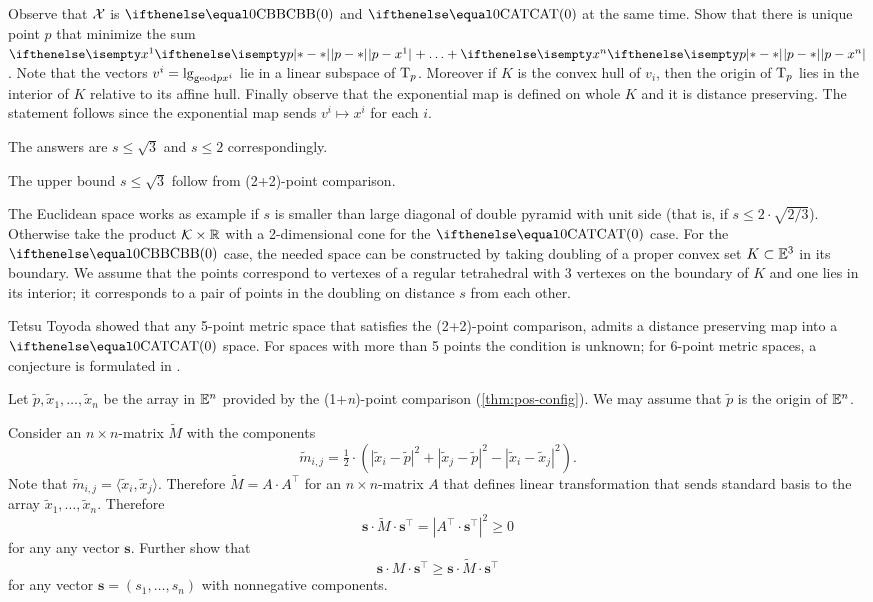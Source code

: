 Observe that $\mathcal{X}$ is $\Alex0$ and $\CAT0$ at the same time.
Show that there is unique point $p$ that minimize the sum $\dist{p}{x^1}{}+\dots+\dist{p}{x^n}{}$.
Note that the vectors $v^i=\lg_{\mathrm{geod}{p}{x^i}}$ lie in a linear subspace of $\text{\rm T}_p$.
Moreover if $K$ is the convex hull of $v_i$, then the origin of $\text{\rm T}_p$ lies in the interior of $K$ relative to its affine hull.
Finally observe that the exponential map is defined on whole $K$ and it is distance preserving.
The statement follows since the exponential map sends $v^i\mapsto x^i$ for each $i$.

The answers are $s\le \sqrt3$ and $s\le 2$ correspondingly.

The upper bound $s\le \sqrt3$ follow from (2+2)-point comparison.

The Euclidean space works as example if $s$ is smaller than large diagonal of double pyramid with unit side (that is, if $s\le 2\cdot\sqrt{2/3}$).
Otherwise take the product $\spc{K}\times \RR$ with a 2-dimensional cone for the $\CAT0$ case.
For the $\Alex0$ case, the needed space can be constructed by taking doubling of a proper convex set $K\subset\EE^3$ in its boundary.
We assume that the points correspond to vertexes of a regular tetrahedral with 3 vertexes on the boundary of $K$ and one lies in its interior; it corresponds to a pair of points in the doubling on distance $s$ from each other.

Tetsu Toyoda \cite{toyoda} showed that any 5-point metric space that satisfies the (2+2)-point comparison, admits a distance preserving map into a $\CAT0$ space.
For spaces with more than 5 points the condition is unknown;
for 6-point metric spaces, a conjecture is formulated in \cite{lebedeva-petrunin-zolotov}.

Let $\tilde p,\tilde x_1,\dots,\tilde x_n$ be the array in $\mathbb{E}^n$ provided by the (1+\textit{n})-point comparison (\ref{thm:pos-config}).
We may assume that $\tilde p$ is the origin of $\mathbb{E}^n$.

Consider an $n{\times}n$-matrix $\tilde M$ with the components 
\[\tilde m_{i,j}=\tfrac12\cdot(|\tilde x_i-\tilde p|^2+|\tilde x_j-\tilde p|^2-|\tilde x_i-\tilde x_j|^2).\]
Note that $\tilde m_{i,j}=\langle\tilde x_i,\tilde x_j\rangle$.
Therefore $\tilde M=A\cdot A^\top$ for an $n{\times}n$-matrix $A$ that defines linear transformation that sends standard basis to the array $\tilde x_1,\dots,\tilde x_n$.
Therefore
\[\bm{s}\cdot \tilde M\cdot \bm{s}^\top=|A^\top\cdot \bm{s}^\top|^2 \ge 0\]
for any any vector $\bm{s}$.
Further show that
\[\bm{s}\cdot M\cdot \bm{s}^\top\ge \bm{s}\cdot \tilde M\cdot \bm{s}^\top\]
for any vector $\bm{s}=(s_1,\dots,s_n)$ with nonnegative components.

